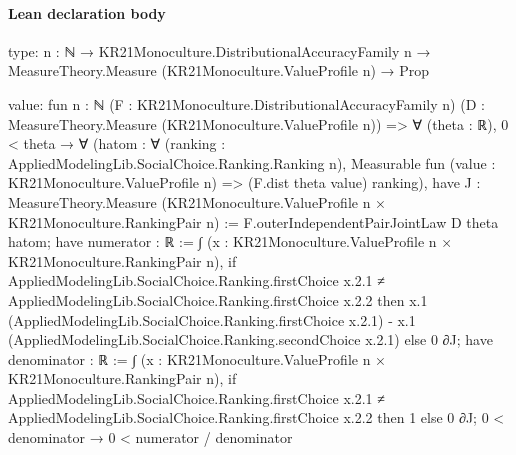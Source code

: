 \documentclass[10pt]{article}
\begin{document}
\paragraph{Lean declaration body}
\begin{ReviewVerbatim}
type:
{n : ℕ} → KR21Monoculture.DistributionalAccuracyFamily n → MeasureTheory.Measure (KR21Monoculture.ValueProfile n) → Prop

value:
fun {n : ℕ} (F : KR21Monoculture.DistributionalAccuracyFamily n)
    (D : MeasureTheory.Measure (KR21Monoculture.ValueProfile n)) =>
  ∀ (theta : ℝ),
    0 < theta →
      ∀
        (hatom :
          ∀ (ranking : AppliedModelingLib.SocialChoice.Ranking.Ranking n),
            Measurable fun (value : KR21Monoculture.ValueProfile n) => (F.dist theta value) ranking),
        have J : MeasureTheory.Measure (KR21Monoculture.ValueProfile n × KR21Monoculture.RankingPair n) :=
          F.outerIndependentPairJointLaw D theta hatom;
        have numerator : ℝ :=
          ∫ (x : KR21Monoculture.ValueProfile n × KR21Monoculture.RankingPair n),
            if
                AppliedModelingLib.SocialChoice.Ranking.firstChoice x.2.1 ≠
                  AppliedModelingLib.SocialChoice.Ranking.firstChoice x.2.2 then
              x.1 (AppliedModelingLib.SocialChoice.Ranking.firstChoice x.2.1) -
                x.1 (AppliedModelingLib.SocialChoice.Ranking.secondChoice x.2.1)
            else 0 ∂J;
        have denominator : ℝ :=
          ∫ (x : KR21Monoculture.ValueProfile n × KR21Monoculture.RankingPair n),
            if
                AppliedModelingLib.SocialChoice.Ranking.firstChoice x.2.1 ≠
                  AppliedModelingLib.SocialChoice.Ranking.firstChoice x.2.2 then
              1
            else 0 ∂J;
        0 < denominator → 0 < numerator / denominator
\end{ReviewVerbatim}
\end{document}
